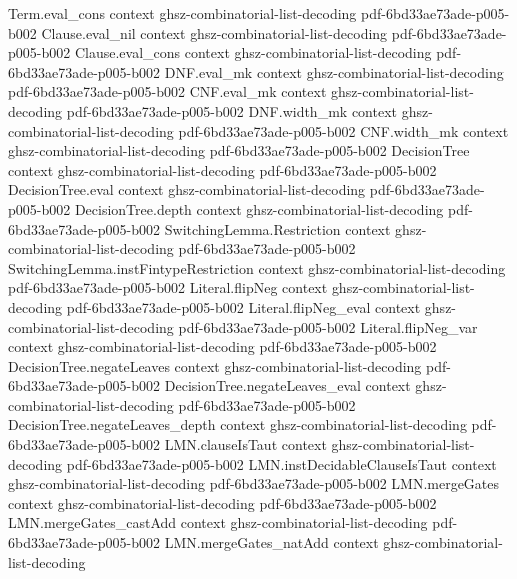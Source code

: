 \begin{lemma}
\proofstep
  {Term.eval_cons}
  {context}
  {ghsz-combinatorial-list-decoding}
  {pdf-6bd33ae73ade-p005-b002}
\proofstep
  {Clause.eval_nil}
  {context}
  {ghsz-combinatorial-list-decoding}
  {pdf-6bd33ae73ade-p005-b002}
\proofstep
  {Clause.eval_cons}
  {context}
  {ghsz-combinatorial-list-decoding}
  {pdf-6bd33ae73ade-p005-b002}
\proofstep
  {DNF.eval_mk}
  {context}
  {ghsz-combinatorial-list-decoding}
  {pdf-6bd33ae73ade-p005-b002}
\proofstep
  {CNF.eval_mk}
  {context}
  {ghsz-combinatorial-list-decoding}
  {pdf-6bd33ae73ade-p005-b002}
\proofstep
  {DNF.width_mk}
  {context}
  {ghsz-combinatorial-list-decoding}
  {pdf-6bd33ae73ade-p005-b002}
\proofstep
  {CNF.width_mk}
  {context}
  {ghsz-combinatorial-list-decoding}
  {pdf-6bd33ae73ade-p005-b002}
\proofstep
  {DecisionTree}
  {context}
  {ghsz-combinatorial-list-decoding}
  {pdf-6bd33ae73ade-p005-b002}
\proofstep
  {DecisionTree.eval}
  {context}
  {ghsz-combinatorial-list-decoding}
  {pdf-6bd33ae73ade-p005-b002}
\proofstep
  {DecisionTree.depth}
  {context}
  {ghsz-combinatorial-list-decoding}
  {pdf-6bd33ae73ade-p005-b002}
\proofstep
  {SwitchingLemma.Restriction}
  {context}
  {ghsz-combinatorial-list-decoding}
  {pdf-6bd33ae73ade-p005-b002}
\proofstep
  {SwitchingLemma.instFintypeRestriction}
  {context}
  {ghsz-combinatorial-list-decoding}
  {pdf-6bd33ae73ade-p005-b002}
\proofstep
  {Literal.flipNeg}
  {context}
  {ghsz-combinatorial-list-decoding}
  {pdf-6bd33ae73ade-p005-b002}
\proofstep
  {Literal.flipNeg_eval}
  {context}
  {ghsz-combinatorial-list-decoding}
  {pdf-6bd33ae73ade-p005-b002}
\proofstep
  {Literal.flipNeg_var}
  {context}
  {ghsz-combinatorial-list-decoding}
  {pdf-6bd33ae73ade-p005-b002}
\proofstep
  {DecisionTree.negateLeaves}
  {context}
  {ghsz-combinatorial-list-decoding}
  {pdf-6bd33ae73ade-p005-b002}
\proofstep
  {DecisionTree.negateLeaves_eval}
  {context}
  {ghsz-combinatorial-list-decoding}
  {pdf-6bd33ae73ade-p005-b002}
\proofstep
  {DecisionTree.negateLeaves_depth}
  {context}
  {ghsz-combinatorial-list-decoding}
  {pdf-6bd33ae73ade-p005-b002}
\proofstep
  {LMN.clauseIsTaut}
  {context}
  {ghsz-combinatorial-list-decoding}
  {pdf-6bd33ae73ade-p005-b002}
\proofstep
  {LMN.instDecidableClauseIsTaut}
  {context}
  {ghsz-combinatorial-list-decoding}
  {pdf-6bd33ae73ade-p005-b002}
\proofstep
  {LMN.mergeGates}
  {context}
  {ghsz-combinatorial-list-decoding}
  {pdf-6bd33ae73ade-p005-b002}
\proofstep
  {LMN.mergeGates_castAdd}
  {context}
  {ghsz-combinatorial-list-decoding}
  {pdf-6bd33ae73ade-p005-b002}
\proofstep
  {LMN.mergeGates_natAdd}
  {context}
  {ghsz-combinatorial-list-decoding}

\end{lemma}
